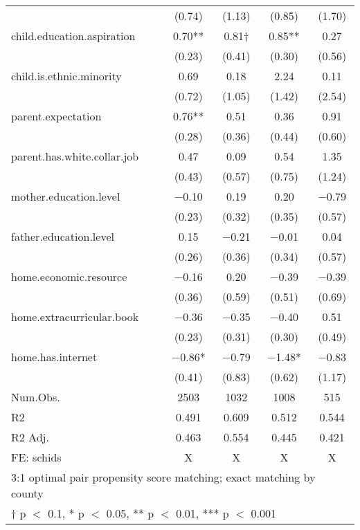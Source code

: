 \documentclass[
  man,floatsintext]{apa7}
\begin{document}
\begin{table}
\begin{tabular}[t]{lcccc}
 & (\num{0.74}) & (\num{1.13}) & (\num{0.85}) & (\num{1.70})\\
child.education.aspiration & \num{0.70}** & \num{0.81}† & \num{0.85}** & \num{0.27}\\
 & (\num{0.23}) & (\num{0.41}) & (\num{0.30}) & (\num{0.56})\\
child.is.ethnic.minority & \num{0.69} & \num{0.18} & \num{2.24} & \num{0.11}\\
 & (\num{0.72}) & (\num{1.05}) & (\num{1.42}) & (\num{2.54})\\
parent.expectation & \num{0.76}** & \num{0.51} & \num{0.36} & \num{0.91}\\
 & (\num{0.28}) & (\num{0.36}) & (\num{0.44}) & (\num{0.60})\\
parent.has.white.collar.job & \num{0.47} & \num{0.09} & \num{0.54} & \num{1.35}\\
 & (\num{0.43}) & (\num{0.57}) & (\num{0.75}) & (\num{1.24})\\
mother.education.level & \num{-0.10} & \num{0.19} & \num{0.20} & \num{-0.79}\\
 & (\num{0.23}) & (\num{0.32}) & (\num{0.35}) & (\num{0.57})\\
father.education.level & \num{0.15} & \num{-0.21} & \num{-0.01} & \num{0.04}\\
 & (\num{0.26}) & (\num{0.36}) & (\num{0.34}) & (\num{0.57})\\
home.economic.resource & \num{-0.16} & \num{0.20} & \num{-0.39} & \num{-0.39}\\
 & (\num{0.36}) & (\num{0.59}) & (\num{0.51}) & (\num{0.69})\\
home.extracurricular.book & \num{-0.36} & \num{-0.35} & \num{-0.40} & \num{0.51}\\
 & (\num{0.23}) & (\num{0.31}) & (\num{0.30}) & (\num{0.49})\\
home.has.internet & \num{-0.86}* & \num{-0.79} & \num{-1.48}* & \num{-0.83}\\
 & (\num{0.41}) & (\num{0.83}) & (\num{0.62}) & (\num{1.17})\\
\midrule
Num.Obs. & \num{2503} & \num{1032} & \num{1008} & \num{515}\\
R2 & \num{0.491} & \num{0.609} & \num{0.512} & \num{0.544}\\
R2 Adj. & \num{0.463} & \num{0.554} & \num{0.445} & \num{0.421}\\
FE: schids & X & X & X & X\\
\bottomrule
\multicolumn{5}{l}{\rule{0pt}{1em}3:1 optimal pair propensity score matching; exact matching by county}\\
\multicolumn{5}{l}{\rule{0pt}{1em}† p $<$ 0.1, * p $<$ 0.05, ** p $<$ 0.01, *** p $<$ 0.001}\\
\end{tabular}
\end{table}
\end{document}
